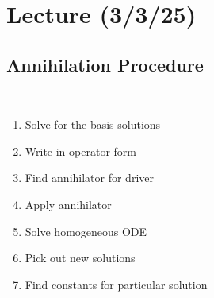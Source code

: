\documentclass[notes]{subfiles}
\begin{document}
\setcounter{section}{12}
\section{Lecture (3/3/25)}

\subsection{Annihilation Procedure}
\begin{procedure}
    ~

    \begin{enumerate}[label = (\arabic*)]
        \item Solve for the basis solutions
        \item Write in operator form
        \item Find annihilator for driver
        \item Apply annihilator
        \item Solve homogeneous ODE
        \item Pick out new solutions
        \item Find constants for particular solution
    \end{enumerate}
\end{procedure}
\end{document}
